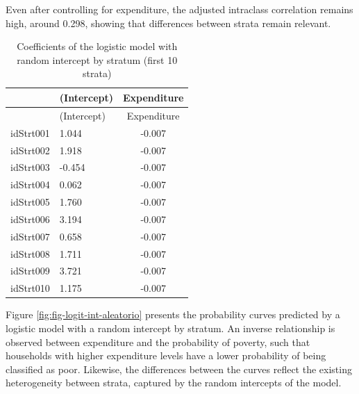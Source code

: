 \documentclass[
  english,
  12pt,
]{book}
\newenvironment{Shaded}{\begin{snugshade}}{\end{snugshade}}
\newcommand{\DataTypeTok}[1]{\textcolor[rgb]{0.13,0.29,0.53}{#1}}
\newcommand{\DecValTok}[1]{\textcolor[rgb]{0.00,0.00,0.81}{#1}}
\newcommand{\FunctionTok}[1]{\textcolor[rgb]{0.13,0.29,0.53}{\textbf{#1}}}
\newcommand{\NormalTok}[1]{#1}
\newcommand{\SpecialCharTok}[1]{\textcolor[rgb]{0.81,0.36,0.00}{\textbf{#1}}}
\begin{document}
Even after controlling for expenditure, the adjusted intraclass correlation remains high, around 0.298, showing that differences between strata remain relevant.

\begin{Shaded}
\end{Shaded}

\begin{longtable}[]{@{}llc@{}}
\caption{\label{tab:tab-coef-logit-int-aleatorio}Coefficients of the logistic model with random intercept by stratum (first 10 strata)}\tabularnewline
\toprule\noalign{}
& (Intercept) & Expenditure \\
\midrule\noalign{}
\endfirsthead
\toprule\noalign{}
& (Intercept) & Expenditure \\
\midrule\noalign{}
\endhead
\bottomrule\noalign{}
\endlastfoot
idStrt001 & 1.044 & -0.007 \\
idStrt002 & 1.918 & -0.007 \\
idStrt003 & -0.454 & -0.007 \\
idStrt004 & 0.062 & -0.007 \\
idStrt005 & 1.760 & -0.007 \\
idStrt006 & 3.194 & -0.007 \\
idStrt007 & 0.658 & -0.007 \\
idStrt008 & 1.711 & -0.007 \\
idStrt009 & 3.721 & -0.007 \\
idStrt010 & 1.175 & -0.007 \\
\end{longtable}

Figure \ref{fig:fig-logit-int-aleatorio} presents the probability curves predicted by a logistic model with a random intercept by stratum. An inverse relationship is observed between expenditure and the probability of poverty, such that households with higher expenditure levels have a lower probability of being classified as poor. Likewise, the differences between the curves reflect the existing heterogeneity between strata, captured by the random intercepts of the model.
\end{document}
